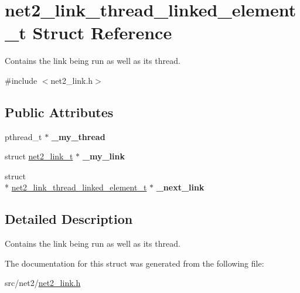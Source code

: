 \hypertarget{structnet2__link__thread__linked__element__t}{\section{net2\-\_\-link\-\_\-thread\-\_\-linked\-\_\-element\-\_\-t Struct Reference}
\label{structnet2__link__thread__linked__element__t}
}


Contains the link being run as well as its thread.  




{\ttfamily \#include $<$net2\-\_\-link.\-h$>$}

\subsection*{Public Attributes}
\begin{DoxyCompactItemize}
\item 
\hypertarget{structnet2__link__thread__linked__element__t_a4de69b752a1213f5cc228e1dd8f83b95}{pthread\-\_\-t $\ast$ {\bfseries \-\_\-my\-\_\-thread}}\label{structnet2__link__thread__linked__element__t_a4de69b752a1213f5cc228e1dd8f83b95}

\item 
\hypertarget{structnet2__link__thread__linked__element__t_a99b68d692f86432ad06502f28f89c175}{struct \hyperlink{structnet2__link__t}{net2\-\_\-link\-\_\-t} $\ast$ {\bfseries \-\_\-my\-\_\-link}}\label{structnet2__link__thread__linked__element__t_a99b68d692f86432ad06502f28f89c175}

\item 
\hypertarget{structnet2__link__thread__linked__element__t_aee53ad34cc55f3b702c5395a5728879d}{struct \\*
\hyperlink{structnet2__link__thread__linked__element__t}{net2\-\_\-link\-\_\-thread\-\_\-linked\-\_\-element\-\_\-t} $\ast$ {\bfseries \-\_\-next\-\_\-link}}\label{structnet2__link__thread__linked__element__t_aee53ad34cc55f3b702c5395a5728879d}

\end{DoxyCompactItemize}


\subsection{Detailed Description}
Contains the link being run as well as its thread. 

The documentation for this struct was generated from the following file\-:\begin{DoxyCompactItemize}
\item 
src/net2/\hyperlink{net2__link_8h}{net2\-\_\-link.\-h}\end{DoxyCompactItemize}
